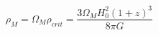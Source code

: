 \begin{equation}\label{rhom}
\rho_M=\Omega_M \rho_{crit}=\frac{3\Omega_M H_0^2(1+z)^3}{8\pi G}
\end{equation}

